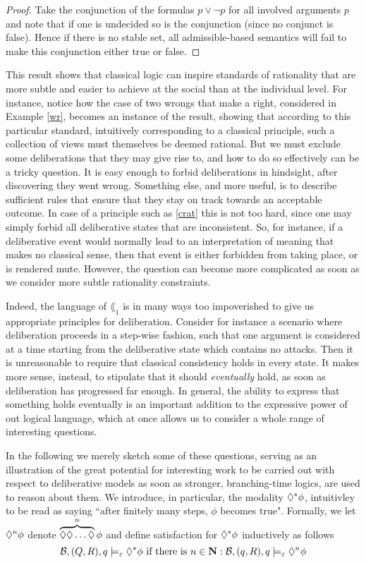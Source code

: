 \documentclass[greybox]{svmult}
\newcommand{\views}{\mathcal B}
\newcommand{\sem}{\varepsilon}
\begin{document}
\begin{proof}
Take the conjunction of the formulas $p \lor \neg p$ for all involved arguments $p$ and note that if one is undecided so is the conjunction (since no conjunct is false). Hence if there is no stable set, all admissible-based semantics will fail to make this conjunction either true or false.
\end{proof}

This result shows that classical logic can inspire standards of rationality that are more subtle and easier to achieve at the social than at the individual level. For instance, notice how the case of two wrongs that make a right, considered in Example \ref{wr}, becomes an instance of the result, showing that according to this particular standard, intuitively corresponding to a classical principle, such a collection of views must themselves be deemed rational. But we must exclude some deliberations that they may give rise to, and how to do so effectively can be a tricky question. It is easy enough to forbid deliberations in hindsight, after discovering they went wrong. Something else, and more useful, is to describe sufficient rules that ensure that they stay on track towards an acceptable outcome. In case of a principle such as \ref{crat} this is not too hard, since one may simply forbid all deliberative states that are inconsistent. So, for instance, if a deliberative event would normally lead to an interpretation of meaning that makes no classical sense, then that event is either forbidden from taking place, or is rendered mute. However, the question can become more complicated as soon as we consider more subtle rationality constraints.

Indeed, the language of $\lang_1$ is in many ways too impoverished to give us appropriate principles for deliberation. Consider for instance a scenario where deliberation proceeds in a step-wise fashion, such that one argument is considered at a time starting from the deliberative state which contains no attacks. Then it is unreasonable to require that classical consistency holds in every state. It makes more sense, instead, to stipulate that it should \emph{eventually} hold, as soon as deliberation has progressed far enough. In general, the ability to express that something holds eventually is an important addition to the expressive power of out logical language, which at once allows us to consider a whole range of interesting questions.

In the following we merely sketch some of these questions, serving as an illustration of the great potential for interesting work to be carried out with respect to deliberative models as soon as stronger, branching-time logics, are used to reason about them. We introduce, in particular, the modality $\lozenge^* \phi$, intuitivley to be read as saying ``after finitely many steps, $\phi$ becomes true". Formally, we let $\lozenge^n \phi$ denote $\overbrace{\lozenge \lozenge \ldots \lozenge}^{n} \phi$ and define satisfaction for $\lozenge^* \phi$ inductively as follows
\begin{equation}\label{sem:star}
\views,(Q,R),q \models_\sem \adia^*\phi \text{ if there is } n \in \mathbf N: \views,(q,R),q\models_\sem \adia^n \phi
\end{equation}
\end{document}

